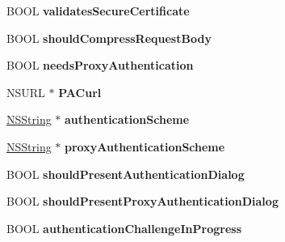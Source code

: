 \begin{DoxyCompactItemize}
\item 
\hypertarget{interface_a_s_i_h_t_t_p_request_af4c82331697b93f1356f69e382e81dd2}{
BOOL {\bfseries validatesSecureCertificate}}
\label{interface_a_s_i_h_t_t_p_request_af4c82331697b93f1356f69e382e81dd2}

\item 
\hypertarget{interface_a_s_i_h_t_t_p_request_a5caebf9227ad199bf7c5fe9439df315c}{
BOOL {\bfseries shouldCompressRequestBody}}
\label{interface_a_s_i_h_t_t_p_request_a5caebf9227ad199bf7c5fe9439df315c}

\item 
\hypertarget{interface_a_s_i_h_t_t_p_request_af8276574a8f4851f132147b46257da7c}{
BOOL {\bfseries needsProxyAuthentication}}
\label{interface_a_s_i_h_t_t_p_request_af8276574a8f4851f132147b46257da7c}

\item 
\hypertarget{interface_a_s_i_h_t_t_p_request_a288caa55750fb0470a766ad46771b036}{
NSURL $\ast$ {\bfseries PACurl}}
\label{interface_a_s_i_h_t_t_p_request_a288caa55750fb0470a766ad46771b036}

\item 
\hypertarget{interface_a_s_i_h_t_t_p_request_af720d24bc1e2e48f8ecdd6e0b0bef1f5}{
\hyperlink{class_n_s_string}{NSString} $\ast$ {\bfseries authenticationScheme}}
\label{interface_a_s_i_h_t_t_p_request_af720d24bc1e2e48f8ecdd6e0b0bef1f5}

\item 
\hypertarget{interface_a_s_i_h_t_t_p_request_ac0a0e9653ee85171666515454fcc69f4}{
\hyperlink{class_n_s_string}{NSString} $\ast$ {\bfseries proxyAuthenticationScheme}}
\label{interface_a_s_i_h_t_t_p_request_ac0a0e9653ee85171666515454fcc69f4}

\item 
\hypertarget{interface_a_s_i_h_t_t_p_request_a0d4ffdc7b8fab1b541a885ab3d07123f}{
BOOL {\bfseries shouldPresentAuthenticationDialog}}
\label{interface_a_s_i_h_t_t_p_request_a0d4ffdc7b8fab1b541a885ab3d07123f}

\item 
\hypertarget{interface_a_s_i_h_t_t_p_request_a89b7f56b45d6c2bb0d9a862025baa7e3}{
BOOL {\bfseries shouldPresentProxyAuthenticationDialog}}
\label{interface_a_s_i_h_t_t_p_request_a89b7f56b45d6c2bb0d9a862025baa7e3}

\item 
\hypertarget{interface_a_s_i_h_t_t_p_request_a23719b6573b67871120af6a15e9e6762}{
BOOL {\bfseries authenticationChallengeInProgress}}
\label{interface_a_s_i_h_t_t_p_request_a23719b6573b67871120af6a15e9e6762}


\end{DoxyCompactItemize}
